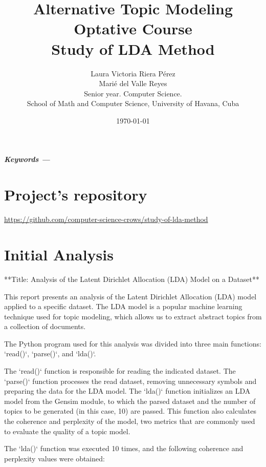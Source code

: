 \documentclass[10pt]{article} %
\title{\normalsize{Alternative Topic Modeling Optative Course}\\
	\Huge\bfseries Study of LDA Method \\
} %
\author{%
	Laura Victoria Riera P\'erez\\
	Mari\'e del Valle Reyes \vspace{1em} \\
	\small Senior year. Computer Science. \\ %
	\small School of Math and Computer Science, University of Havana, Cuba \\ %
}
\date{\footnotesize \today } %
\providecommand{\keywords}[1]
{
	\small	
	\vspace{0.5em}
	\noindent \textbf{\textit{Keywords --- }} #1
}
\renewenvironment{abstract}
{\small
	\begin{center}
		\bfseries \abstractname\vspace{-.5em}\vspace{0pt}
	\end{center}
	\list{}{
		\setlength{\leftmargin}{1.5cm}%
		\setlength{\rightmargin}{\leftmargin}%
	}%
	\item\relax}
{\endlist}
\begin{document}
	\maketitle
	
	\begin{abstract}
		\lipsum[1]
		
		\keywords{}
	\end{abstract}

	\section*{Project's repository}
	
	\begin{center}
		\href{https://github.com/computer-science-crows/study-of-lda-method}{https://github.com/computer-science-crows/study-of-lda-method}
	\end{center}
	
	\section{Initial Analysis}
	
	**Title: Analysis of the Latent Dirichlet Allocation (LDA) Model on a Dataset**
	
	This report presents an analysis of the Latent Dirichlet Allocation (LDA) model applied to a specific dataset. The LDA model is a popular machine learning technique used for topic modeling, which allows us to extract abstract topics from a collection of documents.
	
	The Python program used for this analysis was divided into three main functions: `read()`, `parse()`, and `lda()`.
	
	The `read()` function is responsible for reading the indicated dataset. The `parse()` function processes the read dataset, removing unnecessary symbols and preparing the data for the LDA model. The `lda()` function initializes an LDA model from the Gensim module, to which the parsed dataset and the number of topics to be generated (in this case, 10) are passed. This function also calculates the coherence and perplexity of the model, two metrics that are commonly used to evaluate the quality of a topic model.
	
	The `lda()` function was executed 10 times, and the following coherence and perplexity values were obtained:
	
\end{document}

